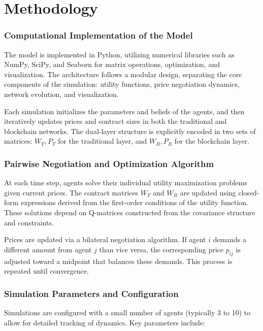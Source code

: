 
\chapter{Methodology}
\label{c4} %

\subsection{Computational Implementation of the Model}

The model is implemented in Python, utilizing numerical libraries such as NumPy, SciPy, and Seaborn for matrix operations, optimization, and visualization. The architecture follows a modular design, separating the core components of the simulation: utility functions, price negotiation dynamics, network evolution, and visualization.

Each simulation initializes the parameters and beliefs of the agents, and then iteratively updates prices and contract sizes in both the traditional and blockchain networks. The dual-layer structure is explicitly encoded in two sets of matrices: \( W_T, P_T \) for the traditional layer, and \( W_B, P_B \) for the blockchain layer.

\subsection{Pairwise Negotiation and Optimization Algorithm}

At each time step, agents solve their individual utility maximization problems given current prices. The contract matrices \( W_T \) and \( W_B \) are updated using closed-form expressions derived from the first-order conditions of the utility function. These solutions depend on Q-matrices constructed from the covariance structure and constraints.

Prices are updated via a bilateral negotiation algorithm. If agent \( i \) demands a different amount from agent \( j \) than vice versa, the corresponding price \( p_{ij} \) is adjusted toward a midpoint that balances these demands. This process is repeated until convergence.

\subsection{Simulation Parameters and Configuration}

Simulations are configured with a small number of agents (typically 3 to 10) to allow for detailed tracking of dynamics. Key parameters include:

